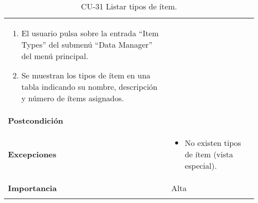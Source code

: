 \begin{longtable}[]{@{}ll@{}}
\begin{minipage}[t]{0.76\columnwidth}
\begin{enumerate}
\def\labelenumi{\arabic{enumi}.}
\tightlist
\item
  El usuario pulsa sobre la entrada ``Item Types'' del submenú ``Data
  Manager'' del menú principal.
\item
  Se muestran los tipos de ítem en una tabla indicando su nombre,
  descripción y número de ítems asignados.
\end{enumerate}\strut
\end{minipage}\tabularnewline
\begin{minipage}[t]{0.18\columnwidth}\raggedright
\textbf{Postcondición}\strut
\end{minipage} & \begin{minipage}[t]{0.76\columnwidth}\raggedright
\strut
\end{minipage}\tabularnewline
\begin{minipage}[t]{0.18\columnwidth}\raggedright
\textbf{Excepciones}\strut
\end{minipage} & \begin{minipage}[t]{0.76\columnwidth}\raggedright
\begin{itemize}
\tightlist
\item
  No existen tipos de ítem (vista especial).
\end{itemize}\strut
\end{minipage}\tabularnewline
\begin{minipage}[t]{0.18\columnwidth}\raggedright
\textbf{Importancia}\strut
\end{minipage} & \begin{minipage}[t]{0.76\columnwidth}\raggedright
Alta\strut
\end{minipage}\tabularnewline
\bottomrule
\caption{CU-31 Listar tipos de ítem.}
\end{longtable}

